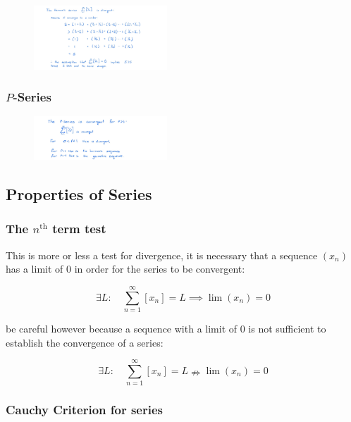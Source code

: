 \documentclass[class=article, crop=false]{standalone}
\begin{document}
\begin{figure}
\centering
\includegraphics[width=5cm]{media/InfSeries/404880AA-8097-4857-B8DB-25933E988C53.jpeg}
\caption{}
\end{figure}

\hypertarget{header-n3157}{%
\subsubsection{\texorpdfstring{\(P\)-Series}{P-Series}}\label{header-n3157}}

\begin{figure}
\centering
\includegraphics[width=5cm]{media/InfSeries/69F206AD-EF00-417C-95ED-31DAD675B9A5.jpeg}
\caption{}
\end{figure}

\newpage
\hypertarget{header-n3160}{%
\subsection{Properties of Series}\label{header-n3160}}

\hypertarget{header-n3161}{%
\subsubsection{\texorpdfstring{The \(n^\text{th}\) term
test}{The n\^{}\textbackslash text\{th\} term test}}\label{header-n3161}}

This is more or less a test for divergence, it is necessary that a
sequence \((x_n)\) has a limit of 0 in order for the series to be
convergent:

\[\exists L : \quad \sum_{n=1}^\infty \left[ x_n \right] = L \implies \lim(x_n)=0\]

be careful however because a sequence with a limit of 0 is not
sufficient to establish the convergence of a series:

\[\exists L : \quad \sum_{n=1}^\infty \left[ x_n \right] = L \nRightarrow \lim(x_n)=0\]

\hypertarget{header-n3167}{%
\subsubsection{Cauchy Criterion for series}\label{header-n3167}}
\end{document}
